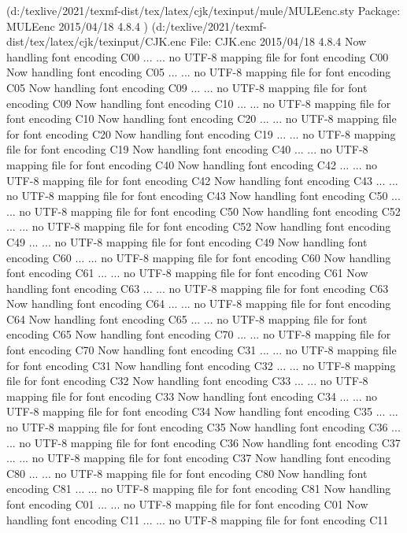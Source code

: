 (d:/texlive/2021/texmf-dist/tex/latex/cjk/texinput/mule/MULEenc.sty
Package: MULEenc 2015/04/18 4.8.4
)
(d:/texlive/2021/texmf-dist/tex/latex/cjk/texinput/CJK.enc
File: CJK.enc 2015/04/18 4.8.4
Now handling font encoding C00 ...
... no UTF-8 mapping file for font encoding C00
Now handling font encoding C05 ...
... no UTF-8 mapping file for font encoding C05
Now handling font encoding C09 ...
... no UTF-8 mapping file for font encoding C09
Now handling font encoding C10 ...
... no UTF-8 mapping file for font encoding C10
Now handling font encoding C20 ...
... no UTF-8 mapping file for font encoding C20
Now handling font encoding C19 ...
... no UTF-8 mapping file for font encoding C19
Now handling font encoding C40 ...
... no UTF-8 mapping file for font encoding C40
Now handling font encoding C42 ...
... no UTF-8 mapping file for font encoding C42
Now handling font encoding C43 ...
... no UTF-8 mapping file for font encoding C43
Now handling font encoding C50 ...
... no UTF-8 mapping file for font encoding C50
Now handling font encoding C52 ...
... no UTF-8 mapping file for font encoding C52
Now handling font encoding C49 ...
... no UTF-8 mapping file for font encoding C49
Now handling font encoding C60 ...
... no UTF-8 mapping file for font encoding C60
Now handling font encoding C61 ...
... no UTF-8 mapping file for font encoding C61
Now handling font encoding C63 ...
... no UTF-8 mapping file for font encoding C63
Now handling font encoding C64 ...
... no UTF-8 mapping file for font encoding C64
Now handling font encoding C65 ...
... no UTF-8 mapping file for font encoding C65
Now handling font encoding C70 ...
... no UTF-8 mapping file for font encoding C70
Now handling font encoding C31 ...
... no UTF-8 mapping file for font encoding C31
Now handling font encoding C32 ...
... no UTF-8 mapping file for font encoding C32
Now handling font encoding C33 ...
... no UTF-8 mapping file for font encoding C33
Now handling font encoding C34 ...
... no UTF-8 mapping file for font encoding C34
Now handling font encoding C35 ...
... no UTF-8 mapping file for font encoding C35
Now handling font encoding C36 ...
... no UTF-8 mapping file for font encoding C36
Now handling font encoding C37 ...
... no UTF-8 mapping file for font encoding C37
Now handling font encoding C80 ...
... no UTF-8 mapping file for font encoding C80
Now handling font encoding C81 ...
... no UTF-8 mapping file for font encoding C81
Now handling font encoding C01 ...
... no UTF-8 mapping file for font encoding C01
Now handling font encoding C11 ...
... no UTF-8 mapping file for font encoding C11
